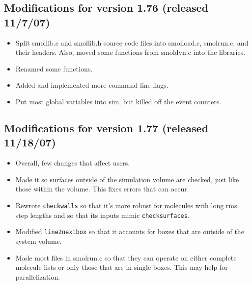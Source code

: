 \documentclass {scrbook}
\newcommand {\ttt} {\texttt}
\begin{document}
\subsection{Modifications for version 1.76 (released 11/7/07)}
\begin{itemize}
\item Split smollib.c and smollib.h source code files into smolload.c, smolrun.c, and their headers. Also, moved some functions from smoldyn.c into the libraries.
\item Renamed some functions.
\item Added and implemented more command-line flags.
\item Put most global variables into sim, but killed off the event counters.
\end{itemize}

\subsection{Modifications for version 1.77 (released 11/18/07)}
\begin{itemize}
\item Overall, few changes that affect users.
\item Made it so surfaces outside of the simulation volume are checked, just like those within the volume. This fixes errors that can occur.
\item Rewrote \ttt{checkwalls} so that it's more robust for molecules with long rms step lengths and so that its inputs mimic \ttt{checksurfaces}.
\item Modified \ttt{line2nextbox} so that it accounts for boxes that are outside of the system volume.
\item Made most files in smolrun.c so that they can operate on either complete molecule lists or only those that are in single boxes. This may help for parallelization.
\end{itemize}
\end{document}
